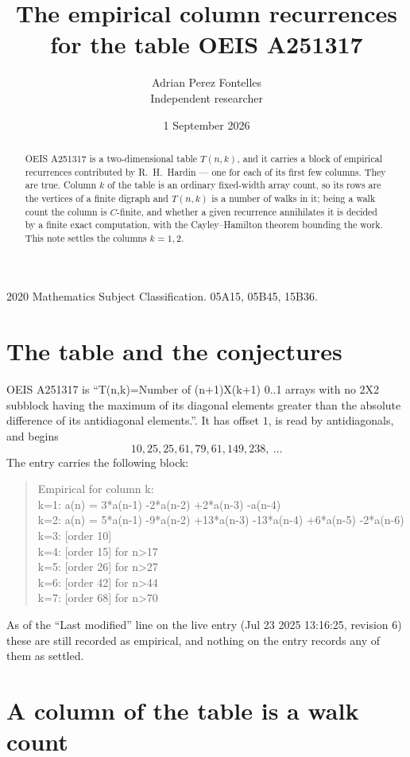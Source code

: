 \documentclass[11pt,a4paper]{article}
\title{The empirical column recurrences for the table OEIS A251317}
\author{Adrian Perez Fontelles\\ \small Independent researcher}
\date{1 September 2026}
\theoremstyle{plain}
\theoremstyle{definition}
\begin{document}
\maketitle

\begin{abstract}
OEIS A251317 is a two-dimensional table $T(n,k)$, and it carries a block of empirical
recurrences contributed by R.~H.~Hardin --- one for each of its first few columns. They are
true. Column $k$ of the table is an ordinary fixed-width array count, so its rows are the
vertices of a finite digraph and $T(n,k)$ is a number of walks in it; being a walk count the
column is $C$-finite, and whether a given recurrence annihilates it is decided by a finite
exact computation, with the Cayley--Hamilton theorem bounding the work. This note settles the columns $k=1, 2$.
\end{abstract}

\noindent\small 2020 Mathematics Subject Classification. 05A15, 05B45, 15B36.\normalsize

\section{The table and the conjectures}

OEIS A251317 is ``T(n,k)=Number of (n+1)X(k+1) 0..1 arrays with no 2X2 subblock having the maximum of its diagonal elements greater than the absolute difference of its antidiagonal elements.''. It has offset $1$, is
read by antidiagonals, and begins
\[
10, 25, 25, 61, 79, 61, 149, 238,\ \dots
\]
The entry carries the following block:
\begin{quote}\small
Empirical for column k:\\
k=1: a(n) = 3*a(n-1) -2*a(n-2) +2*a(n-3) -a(n-4)\\
k=2: a(n) = 5*a(n-1) -9*a(n-2) +13*a(n-3) -13*a(n-4) +6*a(n-5) -2*a(n-6)\\
k=3: [order 10]\\
k=4: [order 15] for n>17\\
k=5: [order 26] for n>27\\
k=6: [order 42] for n>44\\
k=7: [order 68] for n>70\\
\end{quote}
As of the ``Last modified'' line on the live entry (Jul 23 2025 13:16:25, revision 6) these are still
recorded as empirical, and nothing on the entry records any of them as settled.

\section{A column of the table is a walk count}
\end{document}
